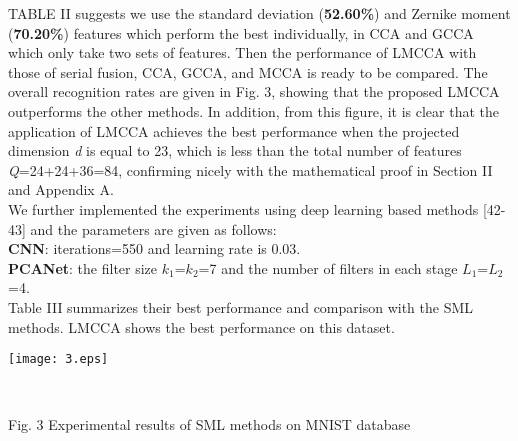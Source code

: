 \documentclass[journal]{IEEEtran}
\begin{document}
TABLE II suggests we use the standard deviation (\textbf{52.60\%}) and Zernike moment (\textbf{70.20\%}) features which perform the best individually, in CCA and GCCA which only take two sets of features.
Then the performance of LMCCA with those of serial fusion, CCA, GCCA, and MCCA is ready to be compared. The overall recognition rates are given in Fig. 3, showing that the proposed LMCCA outperforms the other methods. In addition, from this figure, it is clear that the application of LMCCA achieves the best performance when the projected dimension \emph{d} is equal to 23, which is less than the total number of features \emph{Q}=24+24+36=84, confirming nicely with the mathematical proof in Section II and Appendix A.\\\indent We further implemented the experiments using deep learning based methods [42-43] and the parameters are given as follows:\\
\textbf{CNN}: iterations=550 and learning rate is 0.03.\\
\textbf{PCANet}: the filter size $k_1$=$k_2$=7 and the number of filters in each stage $L_1$=$L_2$=4.\\\indent
Table III summarizes their best performance and comparison with the SML methods. LMCCA shows the best performance on this dataset. \\
\centerline {\texttt{[image: 3.eps]}}\\  \centerline {Fig. 3 Experimental results of SML methods on MNIST database}
\vspace*{-10pt}
\end{document}
